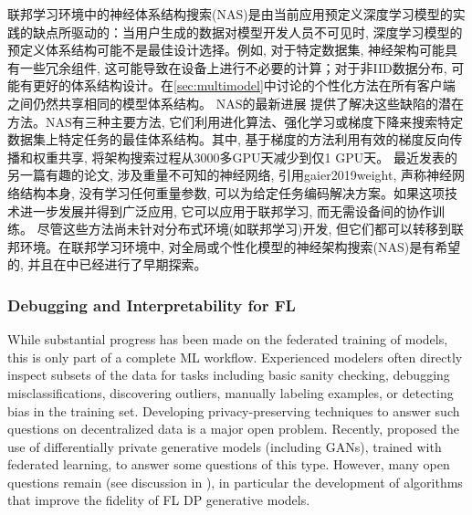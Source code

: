 联邦学习环境中的神经体系结构搜索(NAS)是由当前应用预定义深度学习模型的实践的缺点所驱动的：当用户生成的数据对模型开发人员不可见时, 深度学习模型的预定义体系结构可能不是最佳设计选择。例如, 对于特定数据集, 神经架构可能具有一些冗余组件, 这可能导致在设备上进行不必要的计算；对于非IID数据分布, 可能有更好的体系结构设计。在\cref{sec:multimodel}中讨论的个性化方法在所有客户端之间仍然共享相同的模型体系结构。
NAS的最新进展 \cite{MiLeNAS2020,real2017large,elsken2018efficient,real2019regularized,Bello2016Neural,pham2018efficient,liu2018darts,xie2018snas,elsken2018efficient,luo2018neural}提供了解决这些缺陷的潜在方法。NAS有三种主要方法, 它们利用进化算法、强化学习或梯度下降来搜索特定数据集上特定任务的最佳体系结构。其中, 基于梯度的方法利用有效的梯度反向传播和权重共享, 将架构搜索过程从3000多GPU天减少到仅1 GPU天。
最近发表的另一篇有趣的论文, 涉及重量不可知的神经网络, 引用{gaier2019weight}, 声称神经网络结构本身, 没有学习任何重量参数, 可以为给定任务编码解决方案。如果这项技术进一步发展并得到广泛应用, 它可以应用于联邦学习, 而无需设备间的协作训练。
尽管这些方法尚未针对分布式环境(如联邦学习)开发, 但它们都可以转移到联邦环境。在联邦学习环境中, 对全局或个性化模型的神经架构搜索(NAS)是有希望的, 并且在\citep{he2020fednas}中已经进行了早期探索。



\subsubsection{Debugging and Interpretability for FL}
\label{subsec:debugging-and-interpretability-for-fl}
While substantial progress has been made on the federated training of models, this is only part of a complete ML workflow. Experienced modelers often directly inspect subsets of the data for tasks including basic sanity checking, debugging misclassifications, discovering outliers, manually labeling examples, or detecting bias in the training set. Developing privacy-preserving techniques to answer such questions on decentralized data is a major open problem. Recently, \citet{augenstein2019generative} proposed the use of differentially private generative models (including GANs), trained with federated learning, to answer some questions of this type. However, many open questions remain (see discussion in \citep{augenstein2019generative}), in particular the development of algorithms that improve the fidelity of FL DP generative models. 



